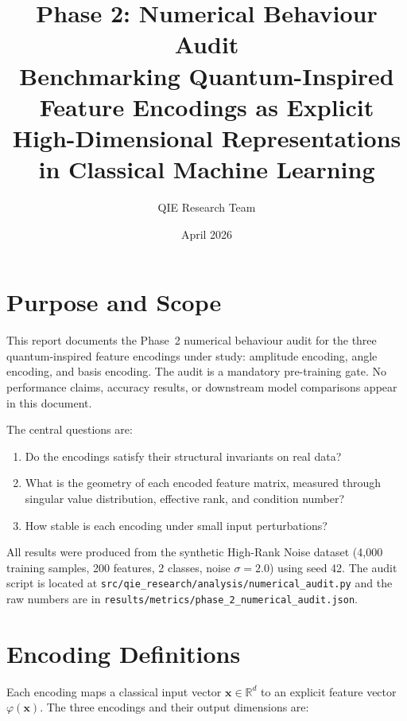 \documentclass[11pt, a4paper]{article}
\title{
    \textbf{Phase 2: Numerical Behaviour Audit} \\
    \large Benchmarking Quantum-Inspired Feature Encodings as Explicit
    High-Dimensional Representations in Classical Machine Learning
}
\author{QIE Research Team}
\date{April 2026}
\begin{document}

\maketitle
\tableofcontents
\newpage

\section{Purpose and Scope}

This report documents the Phase~2 numerical behaviour audit for the three
quantum-inspired feature encodings under study: amplitude encoding, angle
encoding, and basis encoding.  The audit is a mandatory pre-training gate.
No performance claims, accuracy results, or downstream model comparisons
appear in this document.

The central questions are:

\begin{enumerate}
    \item Do the encodings satisfy their structural invariants on real data?
    \item What is the geometry of each encoded feature matrix, measured through
          singular value distribution, effective rank, and condition number?
    \item How stable is each encoding under small input perturbations?
\end{enumerate}

All results were produced from the synthetic High-Rank Noise dataset (4,000 training samples,
200 features, 2 classes, noise $\sigma=2.0$) using seed 42.  The audit script is located at
\texttt{src/qie\_research/analysis/numerical\_audit.py} and the raw numbers
are in \texttt{results/metrics/phase\_2\_numerical\_audit.json}.

\section{Encoding Definitions}

Each encoding maps a classical input vector $\mathbf{x} \in \mathbb{R}^d$
to an explicit feature vector $\varphi(\mathbf{x})$.  The three encodings
and their output dimensions are:
\end{document}
